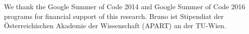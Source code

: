 \documentclass{iosart2x}
\theoremstyle{definition}
\begin{document}



\sloppy  %

\setcounter{footnote}{0}
\newcommand{\la}{\leftarrow}



%






\begin{acks}
We thank the Google Summer of Code 2014 and Google Summer of Code 2016 programs for financial support of this research. 
Bruno ist Stipendiat der \"Osterreichischen Akademie der Wissenschaft (APART) an der TU-Wien.
\end{acks}

\begin{footnotesize}
%


\end{footnotesize}
%
\end{document}
